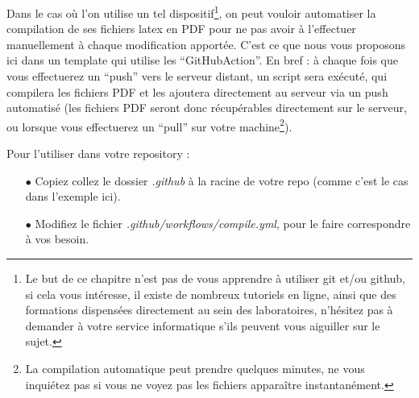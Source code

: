 Dans le cas où l'on utilise un tel dispositif\footnote{Le but de ce chapitre n'est pas de vous apprendre à utiliser git et/ou github, si cela vous intéresse, il existe de nombreux tutoriels en ligne, ainsi que des formations dispensées directement au sein des laboratoires, n'hésitez pas à demander à votre service informatique s'ils peuvent vous aiguiller sur le sujet.}, on peut vouloir automatiser la compilation de ses fichiers latex en PDF pour ne pas avoir à l'effectuer manuellement à chaque modification apportée. C'est ce que nous vous proposons ici dans un template qui utilise les ``GitHubAction''. En bref : à chaque fois que vous effectuerez un ``push'' vers le serveur distant, un script sera exécuté, qui compilera les fichiers PDF et les ajoutera directement au serveur via un push automatisé (les fichiers PDF seront donc récupérables directement sur le serveur, ou lorsque vous effectuerez un ``pull'' sur votre machine\footnote{La compilation automatique peut prendre quelques minutes, ne vous inquiétez pas si vous ne voyez pas les fichiers apparaître instantanément.}). 

Pour l'utiliser dans votre repository :
\begin{itemize}
\item[$\bullet$] Copiez collez le dossier \textit{.github} à la racine de votre repo (comme c'est le cas dans l'exemple ici). 
\item[$\bullet$] Modifiez le fichier \textit{.github/workflows/compile.yml}, pour le faire correspondre à vos besoin.
\end{itemize}

